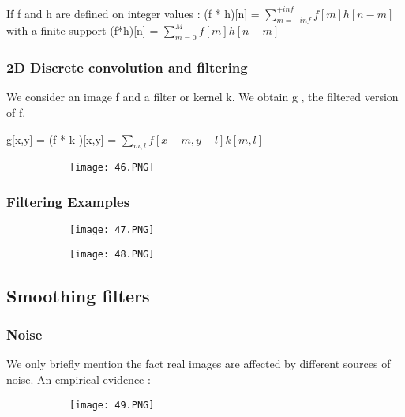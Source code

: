 \documentclass{article}
\begin{document}
If f and h are defined on integer values : (f * h)[n] = $\displaystyle\sum_{m = - inf }^{+inf} f[m]h[n-m]$
with a finite support 
(f*h)[n] = $\displaystyle\sum_{m=0}^{M} f[m]h[n-m]$


\subsubsection{2D Discrete convolution and filtering}

We consider an image f and a filter or kernel k. We obtain g , the filtered version of f.

g[x,y] = (f * k )[x,y] = $\displaystyle\sum_{m,l} f[x-m,y-l]k[m,l]$

\begin{figure}[ht!]
  \centering
  \begin{subfigure}[b]{0.9\linewidth}
    \texttt{[image: 46.PNG]}
  \end{subfigure}
\end{figure}

\vspace{30mm}

\subsubsection{Filtering Examples}


\begin{figure}[ht!]
  \centering
  \begin{subfigure}[b]{0.5\linewidth}
    \texttt{[image: 47.PNG]}
  \end{subfigure}
     \begin{subfigure}[b]{0.4\textwidth}
         \centering
         \texttt{[image: 48.PNG]}
     \end{subfigure}
\end{figure}

\subsection{Smoothing filters}
\subsubsection{Noise}
We only briefly mention the fact real images are affected by different sources of noise. An empirical evidence :

\begin{figure}[ht!]
  \centering
  \begin{subfigure}[b]{0.55\linewidth}
    \texttt{[image: 49.PNG]}
  \end{subfigure}
\end{figure}
\end{document}

